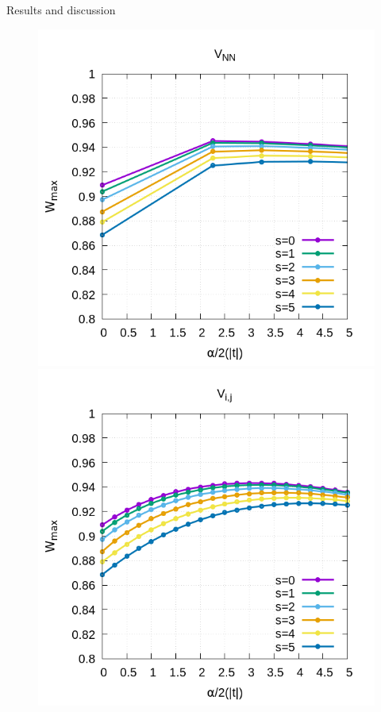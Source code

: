 \documentclass[12pt,twoside]{report}
\begin{document}
\begin{chapter}{Results and discussion}
	\begin{figure}[h!]
		\centering
		\hspace{-2cm}
		\begin{minipage}{0.4\textwidth}
			\includegraphics[scale=0.35]{Wmax_vs_xrep0v1.png}
		\end{minipage}
		\hspace{2cm}
		\begin{minipage}{0.4\textwidth}
			\includegraphics[scale=0.35]{Wmax_vs_xrep0vn.png}

\end{minipage}
\end{figure}
\end{chapter}
\end{document}
